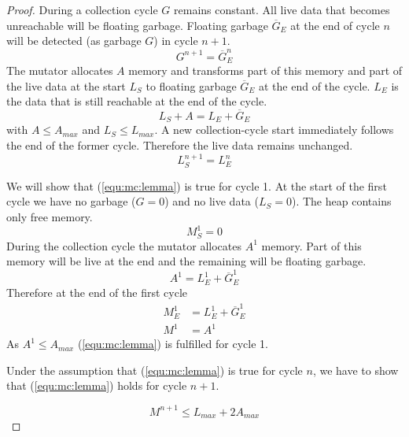 \begin{proof}

During a collection cycle $G$ remains constant. All live data that
becomes unreachable will be floating garbage. Floating garbage
$\overline{G}_E$ at the end of cycle $n$ will be detected (as
garbage $G$) in cycle $n+1$.
%
\begin{equation}\label{equ:flg}
    G^{n+1} = \overline{G}_E^n
\end{equation}
%
The mutator allocates $A$ memory and transforms part of this memory
and part of the live data at the start $L_S$ to floating garbage
$\overline{G}_E$ at the end of the cycle. $L_E$ is the data that is
still reachable at the end of the cycle.
%
\begin{equation}\label{equ:trans}
    L_S + A = L_E + \overline{G}_E
\end{equation}
%
with $A \le A_{max}$ and $L_S \le L_{max}$. A new collection-cycle
start immediately follows the end of the former cycle. Therefore the
live data remains unchanged.
%
\begin{equation}\label{equ:ldata}
    L_S^{n+1} = L_E^{n}
\end{equation}

We will show that (\ref{equ:mc:lemma}) is true for cycle 1. At the
start of the first cycle we have no garbage ($G=0$) and no live data
($L_S=0$). The heap contains only free memory.
%
\begin{equation}\label{equ:mc:start}
    M_S^1 = 0
\end{equation}
%
During the collection cycle the mutator allocates $A^1$ memory. Part
of this memory will be live at the end and the remaining will be
floating garbage.
%
\begin{equation}\label{equ:mc:cyc1:A}
    A^1 = L_E^1 + \overline{G}_E^1
\end{equation}
%
Therefore at the end of the first cycle
%
\begin{align}
\nonumber
    M_E^1 & = L_E^1 + \overline{G}_E^1\\
    M^1   & = A^1
\end{align}
%
As $A^1 \le A_{max}$ (\ref{equ:mc:lemma}) is fulfilled for cycle 1.

Under the assumption that (\ref{equ:mc:lemma}) is true for cycle
$n$, we have to show that (\ref{equ:mc:lemma}) holds for cycle
$n+1$.

\begin{equation}
    M^{n+1} \le L_{max} + 2 A_{max}
\end{equation}


\end{proof}
